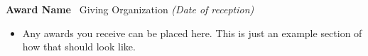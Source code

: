 \documentclass[class=article, crop=false]{standalone}
\begin{document}
\textbf{Award Name} \textbar\ Giving Organization
\hfill \textsl{(Date of reception)}
\begin{itemize}[leftmargin=*]
    \item Any awards you receive can be placed here. This is just an example section 
          of how that should look like.
\end{itemize}
\end{document}
